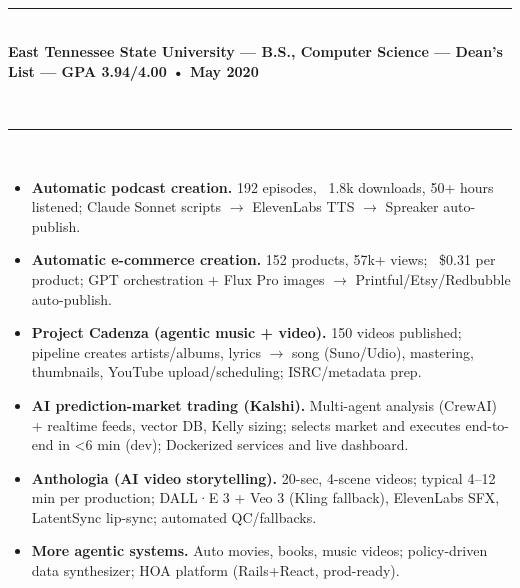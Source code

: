 \documentclass[11pt,a4paper]{article}
\newcommand{\resumesection}[1]{
    \vspace{3pt}                                    %
    \noindent{\fontsize{13}{15}\selectfont\textbf{#1}}\\[-8pt]                    %
    \noindent\textcolor{gray}{\rule{\textwidth}{2pt}}\\[-10pt]  %
}
\newcommand{\regbullet}[1]{
    \item {\fontsize{10}{12}\selectfont #1}
}
\begin{document}

\resumesection{Education}

\noindent\textbf{East Tennessee State University — B.S., Computer Science — Dean's List — GPA 3.94/4.00 • May 2020}\\


\resumesection{Selected Projects}

\begin{itemize}[leftmargin=18pt,itemsep=1pt,topsep=0pt]
\regbullet{\textbf{Automatic podcast creation.} 192 episodes, ~1.8k downloads, 50+ hours listened; Claude Sonnet scripts $\rightarrow$ ElevenLabs TTS $\rightarrow$ Spreaker auto-publish.}

\regbullet{\textbf{Automatic e-commerce creation.} 152 products, 57k+ views; ~\$0.31 per product; GPT orchestration + Flux Pro images $\rightarrow$ Printful/Etsy/Redbubble auto-publish.}

\regbullet{\textbf{Project Cadenza (agentic music + video).} 150 videos published; pipeline creates artists/albums, lyrics $\rightarrow$ song (Suno/Udio), mastering, thumbnails, YouTube upload/scheduling; ISRC/metadata prep.}

\regbullet{\textbf{AI prediction-market trading (Kalshi).} Multi-agent analysis (CrewAI) + realtime feeds, vector DB, Kelly sizing; selects market and executes end-to-end in <6 min (dev); Dockerized services and live dashboard.}

\regbullet{\textbf{Anthologia (AI video storytelling).} 20-sec, 4-scene videos; typical 4--12 min per production; DALL·E 3 + Veo 3 (Kling fallback), ElevenLabs SFX, LatentSync lip-sync; automated QC/fallbacks.}

\regbullet{\textbf{More agentic systems.} Auto movies, books, music videos; policy-driven data synthesizer; HOA platform (Rails+React, prod-ready).}
\end{itemize}
\end{document}
